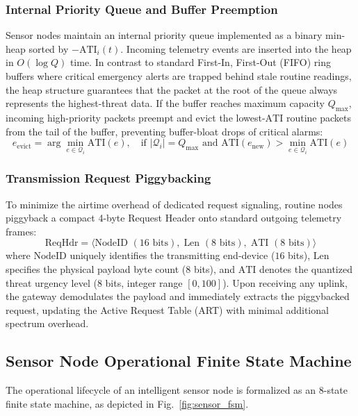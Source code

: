 \documentclass[preprint,review,12pt]{elsarticle}
\begin{document}
\subsubsection{Internal Priority Queue and Buffer Preemption}
Sensor nodes maintain an internal priority queue implemented as a binary min-heap sorted by $- \text{ATI}_i(t)$. Incoming telemetry events are inserted into the heap in $O(\log Q)$ time. In contrast to standard First-In, First-Out (FIFO) ring buffers where critical emergency alerts are trapped behind stale routine readings, the heap structure guarantees that the packet at the root of the queue always represents the highest-threat data. If the buffer reaches maximum capacity $Q_{\text{max}}$, incoming high-priority packets preempt and evict the lowest-$\text{ATI}$ routine packets from the tail of the buffer, preventing buffer-bloat drops of critical alarms:
\begin{equation}
\label{eq:heap_preempt}
e_{\text{evict}} = \arg \min_{e \in \mathcal{Q}_i} \text{ATI}(e), \quad \text{if } |\mathcal{Q}_i| = Q_{\text{max}} \text{ and } \text{ATI}(e_{\text{new}}) > \min_{e \in \mathcal{Q}_i} \text{ATI}(e)
\end{equation}

\subsubsection{Transmission Request Piggybacking}
To minimize the airtime overhead of dedicated request signaling, routine nodes piggyback a compact 4-byte Request Header onto standard outgoing telemetry frames:
\begin{equation}
\label{eq:piggyback_hdr}
\text{ReqHdr} = \langle \text{NodeID } (16\text{ bits}), \; \text{Len } (8\text{ bits}), \; \text{ATI } (8\text{ bits}) \rangle
\end{equation}
where $\text{NodeID}$ uniquely identifies the transmitting end-device ($16$ bits), $\text{Len}$ specifies the physical payload byte count ($8$ bits), and $\text{ATI}$ denotes the quantized threat urgency level ($8$ bits, integer range $[0, 100]$). Upon receiving any uplink, the gateway demodulates the payload and immediately extracts the piggybacked request, updating the Active Request Table (ART) with minimal additional spectrum overhead.

\subsection{Sensor Node Operational Finite State Machine}
The operational lifecycle of an intelligent sensor node is formalized as an 8-state finite state machine, as depicted in Fig.~\ref{fig:sensor_fsm}.
\end{document}
